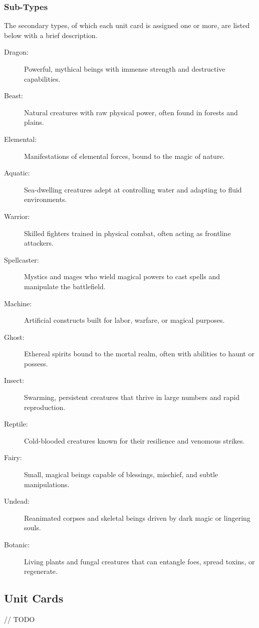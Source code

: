\subsubsection{Sub-Types}
The secondary types, of which each unit card is assigned one or more, are listed below with a brief description.
\begin{description}
  \item[Dragon:] Powerful, mythical beings with immense strength and destructive capabilities.
  \item[Beast:] Natural creatures with raw physical power, often found in forests and plains.
  \item[Elemental:] Manifestations of elemental forces, bound to the magic of nature.
  \item[Aquatic:] Sea-dwelling creatures adept at controlling water and adapting to fluid environments.
  \item[Warrior:] Skilled fighters trained in physical combat, often acting as frontline attackers.
  \item[Spellcaster:] Mystics and mages who wield magical powers to cast spells and manipulate the battlefield.
  \item[Machine:] Artificial constructs built for labor, warfare, or magical purposes.
  \item[Ghost:] Ethereal spirits bound to the mortal realm, often with abilities to haunt or possess.
  \item[Insect:] Swarming, persistent creatures that thrive in large numbers and rapid reproduction.
  \item[Reptile:] Cold-blooded creatures known for their resilience and venomous strikes.
  \item[Fairy:] Small, magical beings capable of blessings, mischief, and subtle manipulations.
  \item[Undead:] Reanimated corpses and skeletal beings driven by dark magic or lingering souls.
  \item[Botanic:] Living plants and fungal creatures that can entangle foes, spread toxins, or regenerate.
\end{description}





\subsection{Unit Cards}
// TODO




